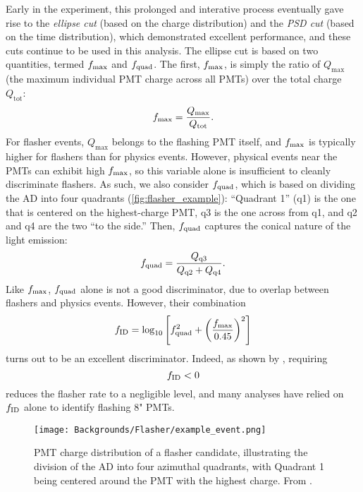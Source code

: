 \documentclass[../thesis.tex]{subfiles}
\begin{document}
Early in the experiment, this prolonged and interative process eventually gave rise to the \emph{ellipse cut} (based on the charge distribution) and the \emph{PSD cut} (based on the time distribution), which demonstrated excellent performance, and these cuts continue to be used in this analysis. The ellipse cut is based on two quantities, termed $f_{\mathrm{max}}$ and $f_{\mathrm{quad}}$. The first, $f_{\mathrm{max}}$, is simply the ratio of $Q_{\mathrm{max}}$ (the maximum individual PMT charge across all PMTs) over the total charge $Q_{\mathrm{tot}}$:
\begin{equation}
  f_{\mathrm{max}} = \frac{Q_{\mathrm{max}}}{Q_{\mathrm{tot}}}.
\end{equation}
For flasher events, $Q_{\mathrm{max}}$ belongs to the flashing PMT itself, and $f_{\mathrm{max}}$ is typically higher for flashers than for physics events. However, physical events near the PMTs can exhibit high $f_{\mathrm{max}}$, so this variable alone is insufficient to cleanly discriminate flashers. As such, we also consider $f_{\mathrm{quad}}$, which is based on dividing the AD into four quadrants (\autoref{fig:flasher_example}): ``Quadrant 1'' (q1) is the one that is centered on the highest-charge PMT, q3 is the one across from q1, and q2 and q4 are the two ``to the side.'' Then, $f_{\mathrm{quad}}$ captures the conical nature of the light emission:
\begin{equation}
  f_{\mathrm{quad}} = \frac{Q_{\mathrm{q3}}}{Q_{\mathrm{q2}} + Q_{\mathrm{q4}}}.
\end{equation}
Like $f_{\mathrm{max}}$, $f_{\mathrm{quad}}$ alone is not a good discriminator, due to overlap between flashers and physics events. However, their combination
\begin{equation}
  f_{\mathrm{ID}} = \log_{10} \left[ f_{\mathrm{quad}}^2 + \left( \frac{f_{\mathrm{max}}}{0.45} \right)^2 \right]
\end{equation}
turns out to be an excellent discriminator. Indeed, as shown by , requiring
\begin{equation}
  \label{eq:ellipseCut}
  f_{\mathrm{ID}} < 0
\end{equation}
reduces the flasher rate to a negligible level, and many analyses have relied on $f_{\mathrm{ID}}$ alone to identify flashing 8" PMTs.

\begin{figure}[h]
  \texttt{[image: Backgrounds/Flasher/example\_event.png]}
  \caption{PMT charge distribution of a flasher candidate, illustrating the division of the AD into four azimuthal quadrants, with Quadrant 1 being centered around the PMT with the highest charge. From \cite{An_2017}.}
  \label{fig:flasher_example}
\end{figure}
\end{document}
